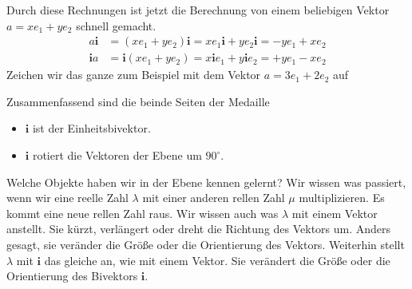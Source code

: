 \documentclass[fleqn]{scrartcl}
\numberwithin{equation}{section}
\def\*#1{\mathbf{#1}}
\begin{document}
Durch diese Rechnungen ist jetzt die Berechnung von einem beliebigen
Vektor $a=xe_1+ye_2$ schnell gemacht.
\begin{align*}
    a\*i &= (xe_1+ye_2)\*i = xe_1\*i+ye_2\*i = -ye_1 + xe_2 \\
    \*ia &= \*i(xe_1+ye_2) = x\*ie_1+y\*ie_2 = +ye_1 - xe_2
\end{align*}
Zeichen wir das ganze zum Beispiel mit dem Vektor $a=3e_1+2e_2$ auf
\begin{center}
\begin{minipage}{\linewidth}
\centering
{}
\captionof{figure}{Rotation um $90^\circ$ mit $\*i$}
\label{fig:rotate90degree}
\end{minipage}
\end{center}

Zusammenfassend sind die beinde Seiten der Medaille
\begin{itemize}
    \item $\*i$ ist der Einheitsbivektor.
    \item $\*i$ rotiert die Vektoren der Ebene um $90^{\circ}$.
\end{itemize}

Welche Objekte haben wir in der Ebene kennen gelernt? Wir wissen was passiert,
wenn wir eine reelle Zahl $\lambda$ mit einer anderen rellen Zahl $\mu$
multiplizieren. Es kommt eine neue rellen Zahl raus. Wir wissen auch was
$\lambda$ mit einem Vektor anstellt. Sie kürzt, verlängert oder dreht die
Richtung des Vektors um. Anders gesagt, sie veränder die Größe oder die
Orientierung des Vektors. Weiterhin stellt $\lambda$ mit $\*i$ das gleiche an,
wie mit einem Vektor. Sie verändert die Größe oder die Orientierung des
Bivektors $\*i$.
\end{document}
